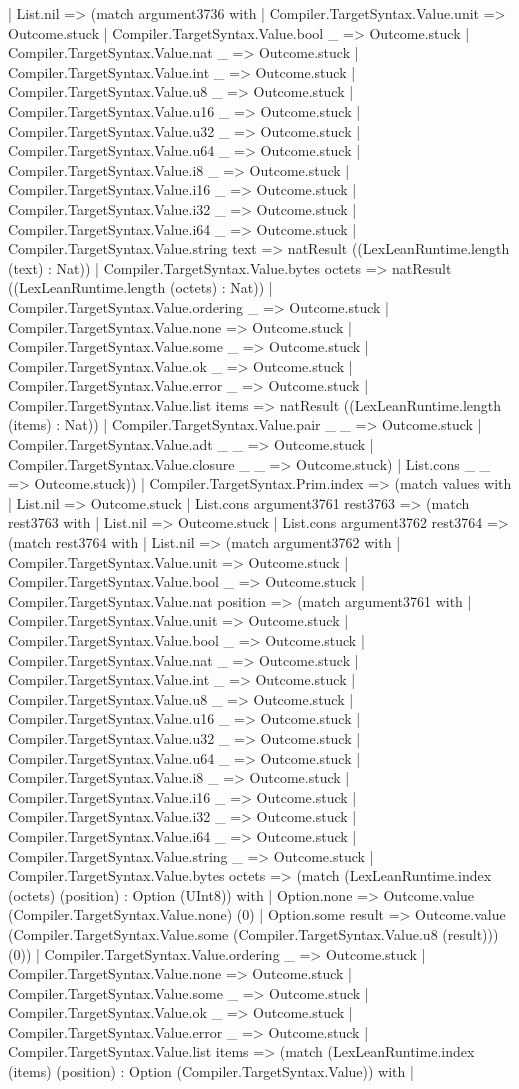 \documentclass[11pt]{article}
\begin{document}
| List.nil => (match argument3736 with | Compiler.TargetSyntax.Value.unit => Outcome.stuck | Compiler.TargetSyntax.Value.bool \_ => Outcome.stuck | Compiler.TargetSyntax.Value.nat \_ => Outcome.stuck | Compiler.TargetSyntax.Value.int \_ => Outcome.stuck | Compiler.TargetSyntax.Value.u8 \_ => Outcome.stuck | Compiler.TargetSyntax.Value.u16 \_ => Outcome.stuck | Compiler.TargetSyntax.Value.u32 \_ => Outcome.stuck | Compiler.TargetSyntax.Value.u64 \_ => Outcome.stuck | Compiler.TargetSyntax.Value.i8 \_ => Outcome.stuck | Compiler.TargetSyntax.Value.i16 \_ => Outcome.stuck | Compiler.TargetSyntax.Value.i32 \_ => Outcome.stuck | Compiler.TargetSyntax.Value.i64 \_ => Outcome.stuck | Compiler.TargetSyntax.Value.string text => natResult ((LexLeanRuntime.length (text) : Nat)) | Compiler.TargetSyntax.Value.bytes octets => natResult ((LexLeanRuntime.length (octets) : Nat)) | Compiler.TargetSyntax.Value.ordering \_ => Outcome.stuck | Compiler.TargetSyntax.Value.none => Outcome.stuck | Compiler.TargetSyntax.Value.some \_ => Outcome.stuck | Compiler.TargetSyntax.Value.ok \_ => Outcome.stuck | Compiler.TargetSyntax.Value.error \_ => Outcome.stuck | Compiler.TargetSyntax.Value.list items => natResult ((LexLeanRuntime.length (items) : Nat)) | Compiler.TargetSyntax.Value.pair \_ \_ => Outcome.stuck | Compiler.TargetSyntax.Value.adt \_ \_ => Outcome.stuck | Compiler.TargetSyntax.Value.closure \_ \_ => Outcome.stuck) | List.cons \_ \_ => Outcome.stuck)) | Compiler.TargetSyntax.Prim.index => (match values with | List.nil => Outcome.stuck | List.cons argument3761 rest3763 => (match rest3763 with | List.nil => Outcome.stuck | List.cons argument3762 rest3764 => (match rest3764 with | List.nil => (match argument3762 with | Compiler.TargetSyntax.Value.unit => Outcome.stuck | Compiler.TargetSyntax.Value.bool \_ => Outcome.stuck | Compiler.TargetSyntax.Value.nat position => (match argument3761 with | Compiler.TargetSyntax.Value.unit => Outcome.stuck | Compiler.TargetSyntax.Value.bool \_ => Outcome.stuck | Compiler.TargetSyntax.Value.nat \_ => Outcome.stuck | Compiler.TargetSyntax.Value.int \_ => Outcome.stuck | Compiler.TargetSyntax.Value.u8 \_ => Outcome.stuck | Compiler.TargetSyntax.Value.u16 \_ => Outcome.stuck | Compiler.TargetSyntax.Value.u32 \_ => Outcome.stuck | Compiler.TargetSyntax.Value.u64 \_ => Outcome.stuck | Compiler.TargetSyntax.Value.i8 \_ => Outcome.stuck | Compiler.TargetSyntax.Value.i16 \_ => Outcome.stuck | Compiler.TargetSyntax.Value.i32 \_ => Outcome.stuck | Compiler.TargetSyntax.Value.i64 \_ => Outcome.stuck | Compiler.TargetSyntax.Value.string \_ => Outcome.stuck | Compiler.TargetSyntax.Value.bytes octets => (match (LexLeanRuntime.index (octets) (position) : Option (UInt8)) with | Option.none => Outcome.value (Compiler.TargetSyntax.Value.none) (0) | Option.some result => Outcome.value (Compiler.TargetSyntax.Value.some (Compiler.TargetSyntax.Value.u8 (result))) (0)) | Compiler.TargetSyntax.Value.ordering \_ => Outcome.stuck | Compiler.TargetSyntax.Value.none => Outcome.stuck | Compiler.TargetSyntax.Value.some \_ => Outcome.stuck | Compiler.TargetSyntax.Value.ok \_ => Outcome.stuck | Compiler.TargetSyntax.Value.error \_ => Outcome.stuck | Compiler.TargetSyntax.Value.list items => (match (LexLeanRuntime.index (items) (position) : Option (Compiler.TargetSyntax.Value)) with | 
\end{document}
